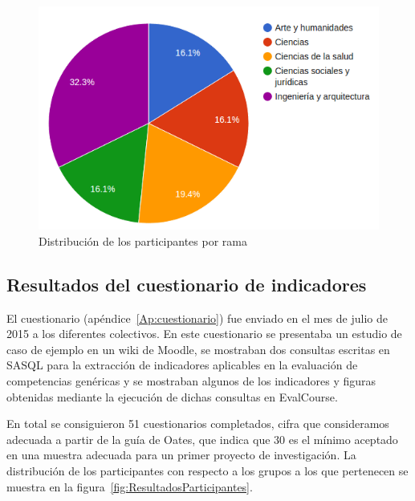 
\begin{figure}
  \begin{center}
    \includegraphics[scale=0.5]{EncuestaRamasPie.png}
  \end{center}
  \caption{Distribución de los participantes por rama}
  \label{fig:cap:encuesta:rama}
\end{figure}



\subsection{Resultados del cuestionario de indicadores}

El cuestionario (apéndice~\ref{Ap:cuestionario}) fue enviado en el mes de julio de 2015 a los diferentes colectivos. En este cuestionario se presentaba un estudio de caso de ejemplo en un wiki de Moodle, se mostraban dos consultas escritas en SASQL para la extracción de indicadores aplicables en la evaluación de competencias genéricas y se mostraban algunos de los indicadores y figuras obtenidas mediante la ejecución de dichas consultas en EvalCourse. 

En total se consiguieron 51 cuestionarios completados, cifra que consideramos adecuada a partir de la guía de Oates, que indica que 30 es el mínimo aceptado en una muestra adecuada para un primer proyecto de investigación. La distribución de los participantes con respecto a los grupos a los que pertenecen se muestra en la figura~\ref{fig:ResultadosParticipantes}.

